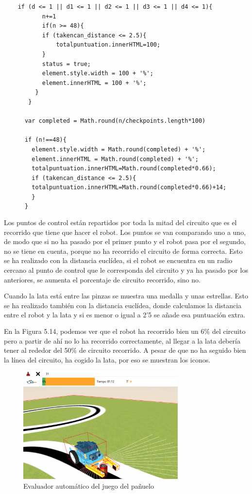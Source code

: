 \begin{lstlisting}
	if (d <= 1 || d1 <= 1 || d2 <= 1 || d3 <= 1 || d4 <= 1){
	       n+=1
	       if(n >= 48){
		   if (takencan_distance <= 2.5){
		       totalpuntuation.innerHTML=100;
		   }
		   status = true;
		   element.style.width = 100 + '%';
		   element.innerHTML = 100 + '%';
	     }
	   }
	  
	  var completed = Math.round(n/checkpoints.length*100)
	  
	  if (n!==48){
	    element.style.width = Math.round(completed) + '%';
	    element.innerHTML = Math.round(completed) + '%';
	    totalpuntuation.innerHTML=Math.round(completed*0.66);
	    if (takencan_distance <= 2.5){
		totalpuntuation.innerHTML=Math.round(completed*0.66)+14;
	    }
	  }
\end{lstlisting}

Los puntos de control están repartidos por toda la mitad del circuito que es el recorrido que tiene que hacer el robot. Los puntos se van comparando uno a uno, de modo que si no ha pasado por el primer punto y el robot pasa por el segundo, no se tiene en cuenta, porque no ha recorrido el circuito de forma correcta. Esto se ha realizado con la distancia euclídea, si el robot se encuentra en un radio cercano al punto de control que le corresponda del circuito y ya ha pasado por los anteriores, se aumenta el porcentaje de circuito recorrido, sino no.

Cuando la lata está entre las pinzas se muestra una medalla y unas estrellas. Esto se ha realizado también con la distancia euclídea, donde calculamos la distancia entre el robot y la lata y si es menor o igual a 2'5 se añade esa puntuación extra.

En la Figura 5.14, podemos ver que el robot ha recorrido bien un 6\% del circuito pero a partir de ahí no lo ha recorrido correctamente, al llegar a la lata debería tener al rededor del  50\% de circuito recorrido. A pesar de que no ha seguido bien la línea del circuito, ha cogido la lata, por eso se muestran los iconos.

 \begin{figure}[H]
  \centering
 \includegraphics[width=0.75\textwidth, height=0.45\textwidth]{chapters/images/evaluadorpinza.png}
  \caption{Evaluador automático del juego del pañuelo}
\end{figure}


